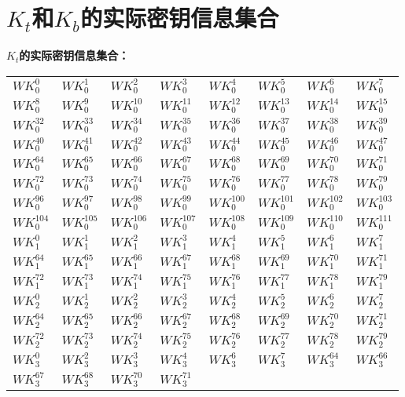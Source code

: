 \chapter{$K_t$和$K_b$的实际密钥信息集合}\label{AppendixA}
\textbf{$K_t$的实际密钥信息集合：}
\begin{table}[!h]
    \centering
\begin{tabular}{|l|l|l|l|l|l|l|l|}
\hline
$WK_{0}^{0}$&$WK_{0}^{1}$&$WK_{0}^{2}$&$WK_{0}^{3}$ &$WK_{0}^{4}$ &$WK_{0}^{5}$ &$WK_{0}^{6}$&$WK_{0}^{7}$\\
$WK_{0}^{8}$ &$WK_{0}^{9}$& $WK_{0}^{10}$& $WK_{0}^{11}$& $WK_{0}^{12}$&$WK_{0}^{13}$& $WK_{0}^{14}$& $WK_{0}^{15}$\\
$WK_{0}^{32}$ &$WK_{0}^{33}$ &$WK_{0}^{34}$&$WK_{0}^{35}$ &$WK_{0}^{36}$ &$WK_{0}^{37}$ &$WK_{0}^{38}$ &$WK_{0}^{39}$\\
$WK_{0}^{40}$&$WK_{0}^{41}$ &$WK_{0}^{42}$ &$WK_{0}^{43}$&$WK_{0}^{44}$&$WK_{0}^{45}$ &$WK_{0}^{46}$ &$WK_{0}^{47}$ \\
$WK_{0}^{64}$ &$WK_{0}^{65}$&$WK_{0}^{66}$&$WK_{0}^{67}$ &$WK_{0}^{68}$&$WK_{0}^{69}$&$WK_{0}^{70}$ &$WK_{0}^{71}$\\
$WK_{0}^{72}$ &$WK_{0}^{73}$ &$WK_{0}^{74}$ &$WK_{0}^{75}$&$WK_{0}^{76}$ &$WK_{0}^{77}$ &$WK_{0}^{78}$ &$WK_{0}^{79}$\\
$WK_{0}^{96}$&$WK_{0}^{97}$ &$WK_{0}^{98}$&$WK_{0}^{99}$ &$WK_{0}^{100}$ &$WK_{0}^{101}$&$WK_{0}^{102}$ &$WK_{0}^{103}$\\
$WK_{0}^{104}$&$WK_{0}^{105}$&$WK_{0}^{106}$&$WK_{0}^{107}$ &$WK_{0}^{108}$&$WK_{0}^{109}$ &$WK_{0}^{110}$ &$WK_{0}^{111}$\\
$WK_{1}^{0}$&$WK_{1}^{1}$&$WK_{1}^{2}$&$WK_{1}^{3}$&$WK_{1}^{4}$&$WK_{1}^{5}$&$WK_{1}^{6}$&$WK_{1}^{7}$\\
$WK_{1}^{64}$&$WK_{1}^{65}$&$WK_{1}^{66}$&$WK_{1}^{67}$&$WK_{1}^{68}$&$WK_{1}^{69}$&$WK_{1}^{70}$&$WK_{1}^{71}$\\
$WK_{1}^{72}$&$WK_{1}^{73}$&$WK_{1}^{74}$&$WK_{1}^{75}$&$WK_{1}^{76}$&$WK_{1}^{77}$&$WK_{1}^{78}$&$WK_{1}^{79}$\\
$WK_{2}^{0}$&$WK_{2}^{1}$&$WK_{2}^{2}$&$WK_{2}^{3}$&$WK_{2}^{4}$&$WK_{2}^{5}$&$WK_{2}^{6}$&$WK_{2}^{7}$\\
$WK_{2}^{64}$&$WK_{2}^{65}$&$WK_{2}^{66}$&$WK_{2}^{67}$&$WK_{2}^{68}$&$WK_{2}^{69}$&$WK_{2}^{70}$&$WK_{2}^{71}$\\
$WK_{2}^{72}$&$WK_{2}^{73}$&$WK_{2}^{74}$&$WK_{2}^{75}$&$WK_{2}^{76}$&$WK_{2}^{77}$&$WK_{2}^{78}$&$WK_{2}^{79}$\\
$WK_{3}^{0}$&$WK_{3}^{2}$&$WK_{3}^{3}$&$WK_{3}^{4}$&$WK_{3}^{6}$&$WK_{3}^{7}$&$WK_{3}^{64}$&$WK_{3}^{66}$\\
$WK_{3}^{67}$&$WK_{3}^{68}$&$WK_{3}^{70}$&$WK_{3}^{71}$&&&&\\
\hline
\end{tabular}
\end{table}
\newpage


